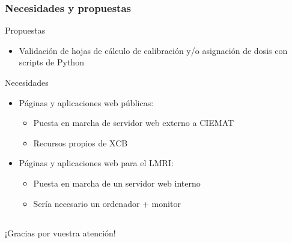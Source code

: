 \documentclass{beamer}
\newcommand{\highlight}[1]{{\color{blue} #1}}
\newcommand{\done}{{\color{green}\ding{52}}}
\newcommand{\doing}{{\color{orange}\ding{229}}}
\begin{document}
	\begin{frame}
		\frametitle{Necesidades y propuestas}
		\highlight{Propuestas}
		\begin{itemize}
			\item Validación de hojas de cálculo de calibración y/o asignación de dosis con scripts de Python
		\end{itemize}
		\highlight{Necesidades}
		\begin{itemize}
			\item Páginas y aplicaciones web \highlight{públicas}:
			\begin{itemize}
				\item Puesta en marcha de servidor web externo a CIEMAT
				\item Recursos propios de XCB \done
			\end{itemize}
			\item Páginas y aplicaciones web para el \highlight{LMRI}:
			\begin{itemize}
				\item Puesta en marcha de un servidor web interno
				\item Sería necesario un ordenador + monitor \doing
			\end{itemize}
		\end{itemize}
	\end{frame}
	
	\subsection{}
	
	\begin{frame}
		\begin{block}{}
			\centering
			¡Gracias por vuestra atención!
		\end{block}
	\end{frame}
\end{document}
